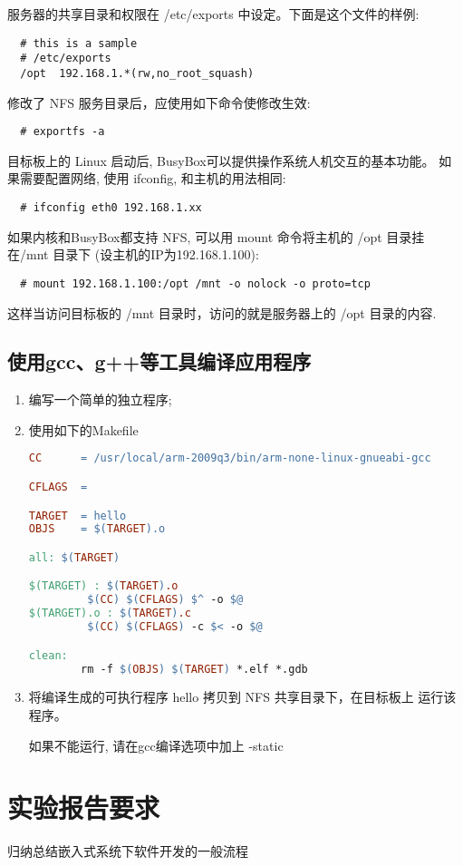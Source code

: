 服务器的共享目录和权限在 /etc/exports 中设定。下面是这个文件的样例:
\begin{verbatim}
  # this is a sample
  # /etc/exports
  /opt  192.168.1.*(rw,no_root_squash)
\end{verbatim}

修改了 NFS 服务目录后，应使用如下命令使修改生效:
\begin{verbatim}
  # exportfs -a
\end{verbatim}

目标板上的 Linux 启动后, BusyBox可以提供操作系统人机交互的基本功能。
如果需要配置网络, 使用 ifconfig, 和主机的用法相同:
\begin{verbatim}
  # ifconfig eth0 192.168.1.xx
\end{verbatim}

如果内核和BusyBox都支持 NFS, 可以用 mount 命令将主机的 /opt 目录挂在/mnt 
目录下 (设主机的IP为192.168.1.100):
\begin{verbatim}
  # mount 192.168.1.100:/opt /mnt -o nolock -o proto=tcp
\end{verbatim}

 这样当访问目标板的 /mnt 目录时，访问的就是服务器上的 /opt 目录的内容.

\subsection{使用gcc、g++等工具编译应用程序}
\begin{enumerate}
  \item 编写一个简单的独立程序;
  \item 使用如下的Makefile

\begin{lstlisting}[language=make]
CC      = /usr/local/arm-2009q3/bin/arm-none-linux-gnueabi-gcc

CFLAGS  =

TARGET  = hello
OBJS    = $(TARGET).o

all: $(TARGET)

$(TARGET) : $(TARGET).o
         $(CC) $(CFLAGS) $^ -o $@
$(TARGET).o : $(TARGET).c
         $(CC) $(CFLAGS) -c $< -o $@

clean:
        rm -f $(OBJS) $(TARGET) *.elf *.gdb
\end{lstlisting}

  \item 将编译生成的可执行程序 hello 拷贝到 NFS 共享目录下，在目标板上
		运行该程序。

		如果不能运行, 请在gcc编译选项中加上 -static
\end{enumerate}

\section{实验报告要求}
    归纳总结嵌入式系统下软件开发的一般流程
